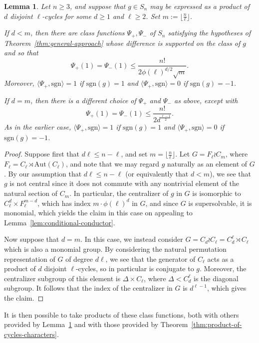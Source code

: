 \documentclass[12pt]{amsart}
\newtheorem{lemma}[theorem]{Lemma}
\theoremstyle{definition} \newtheorem{definition}[theorem]{Definition}
\theoremstyle{example} \newtheorem{example}[theorem]{Example}
\theoremstyle{remark} \newtheorem{remark}{Remark}[theorem]
\numberwithin{equation}{section}
\numberwithin{theorem}{section}
\renewcommand{\leq}{\leqslant}
\renewcommand{\geq}{\geqslant}
\newcommand{\sgn}{\mathrm{sgn}}
\begin{document}
	\begin{lemma}\label{lem:alternate-Sn-choices}
		Let $n \geq 3$, and suppose that $g \in S_n$ may be expressed as a product of $d$ disjoint $\ell$-cycles for some $d \geq 1$ and $\ell \geq 2$.  Set $m := \lfloor \frac{n}{\ell}\rfloor$.  
		
		If $d <m$, then there are class functions $\Psi_+,\Psi_-$ of $S_n$ satisfying the hypotheses of Theorem~\ref{thm:general-approach} whose difference is supported on the class of $g$ and so that
			\[
				\Psi_+(1) = \Psi_-(1) \leq \frac{n!}{2\phi(\ell)^{d/2} \sqrt{m}}.
			\]
		Moreover, $\langle \Psi_+,\sgn\rangle = 1$ if $\sgn(g)=1$ and $\langle \Psi_+,\sgn\rangle = 0$ if $\sgn(g) = -1$.
		
		If $d=m$, then there is a different choice of $\Psi_+$ and $\Psi_-$ as above, except with
			\[
				\Psi_+(1) = \Psi_-(1) \leq \frac{n!}{2d^{\frac{\ell-1}{2}}}.
			\]
		As in the earlier case, $\langle \Psi_+,\sgn\rangle = 1$ if $\sgn(g)=1$ and $\langle \Psi_+,\sgn\rangle = 0$ if $\sgn(g) = -1$.
	\end{lemma}
	\begin{proof}
		Suppose first that $d \ell \leq n-\ell$, and set $m = \lfloor \frac{n}{\ell} \rfloor$.  Let $G = F_\ell \wr C_m$, where $F_\ell = C_\ell \rtimes \mathrm{Aut}(C_\ell)$, and note that we may regard $g$ naturally as an element of $G$.  By our assumption that $d \ell \leq n-\ell$ (or equivalently that $d < m$), we see that $g$ is not central since it does not commute with any nontrivial element of the natural section of $C_m$.  In particular, the centralizer of $g$ in $G$ is isomorphic to $C_\ell^d \times F_\ell^{m-d}$, which has index $m \cdot \phi(\ell)^d$ in $G$, and since $G$ is supersolvable, it is monomial, which yields the claim in this case on appealing to Lemma~\ref{lem:conditional-conductor}.
		
		Now suppose that $d=m$.  In this case, we instead consider $G = C_d \wr C_\ell = C_d^\ell \rtimes C_\ell$ which is also a monomial group.  By considering the natural permutation representation of $G$ of degree $d\ell$, we see that the generator of $C_\ell$ acts as a product of $d$ disjoint $\ell$-cycles, so in particular is conjugate to $g$.  Moreover, the centralizer subgroup of this element is $\Delta \times C_\ell$, where $\Delta < C_d^\ell$ is the diagonal subgroup.  It follows that the index of the centralizer in $G$ is $d^{\ell-1}$, which gives the claim.
	\end{proof}
	
	It is then possible to take products of these class functions, both with others provided by Lemma~\ref{lem:alternate-Sn-choices} and with those provided by Theorem~\ref{thm:product-of-cycles-characters}.
	
\end{document}
